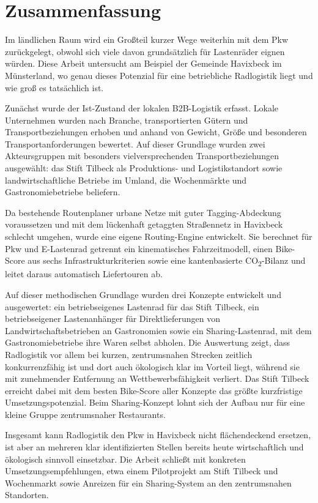 \documentclass[a4paper,11pt,parskip=half,numbers=noenddot]{scrreprt}
\begin{document}

\chapter*{Zusammenfassung}

Im ländlichen Raum wird ein Großteil kurzer Wege weiterhin mit dem Pkw zurückgelegt, obwohl sich viele davon grundsätzlich für Lastenräder eignen würden. Diese Arbeit untersucht am Beispiel der Gemeinde Havixbeck im Münsterland, wo genau dieses Potenzial für eine betriebliche Radlogistik liegt und wie groß es tatsächlich ist.

Zunächst wurde der Ist-Zustand der lokalen B2B-Logistik erfasst. Lokale Unternehmen wurden nach Branche, transportierten Gütern und Transportbeziehungen erhoben und anhand von Gewicht, Größe und besonderen Transportanforderungen bewertet. Auf dieser Grundlage wurden zwei Akteursgruppen mit besonders vielversprechenden Transportbeziehungen ausgewählt: das Stift Tilbeck als Produktions- und Logistikstandort sowie landwirtschaftliche Betriebe im Umland, die Wochenmärkte und Gastronomiebetriebe beliefern.

Da bestehende Routenplaner urbane Netze mit guter Tagging-Abdeckung voraussetzen und mit dem lückenhaft getaggten Straßennetz in Havixbeck schlecht umgehen, wurde eine eigene Routing-Engine entwickelt. Sie berechnet für Pkw und E-Lastenrad getrennt ein kinematisches Fahrzeitmodell, einen Bike-Score aus sechs Infrastrukturkriterien sowie eine kantenbasierte CO\textsubscript{2}-Bilanz und leitet daraus automatisch Liefertouren ab.

Auf dieser methodischen Grundlage wurden drei Konzepte entwickelt und ausgewertet: ein betriebseigenes Lastenrad für das Stift Tilbeck, ein betriebseigener Lastenanhänger für Direktlieferungen von Landwirtschaftsbetrieben an Gastronomien sowie ein Sharing-Lastenrad, mit dem Gastronomiebetriebe ihre Waren selbst abholen. Die Auswertung zeigt, dass Radlogistik vor allem bei kurzen, zentrumsnahen Strecken zeitlich konkurrenzfähig ist und dort auch ökologisch klar im Vorteil liegt, während sie mit zunehmender Entfernung an Wettbewerbsfähigkeit verliert. Das Stift Tilbeck erreicht dabei mit dem besten Bike-Score aller Konzepte das größte kurzfristige Umsetzungspotenzial. Beim Sharing-Konzept lohnt sich der Aufbau nur für eine kleine Gruppe zentrumsnaher Restaurants.

Insgesamt kann Radlogistik den Pkw in Havixbeck nicht flächendeckend ersetzen, ist aber an mehreren klar identifizierten Stellen bereits heute wirtschaftlich und ökologisch sinnvoll einsetzbar. Die Arbeit schließt mit konkreten Umsetzungsempfehlungen, etwa einem Pilotprojekt am Stift Tilbeck und Wochenmarkt sowie Anreizen für ein Sharing-System an den zentrumsnahen Standorten.
\end{document}
